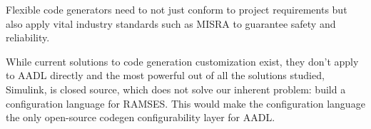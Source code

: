 \begin{tcolorbox}[colback=blue!5, colframe=blue!40!black] Flexible code generators need to not just conform to project requirements but also apply vital industry standards such as \gls{MISRA} to guarantee safety and reliability. \end{tcolorbox}


While current solutions to code generation customization exist, they don't apply to AADL directly and the most powerful out of all the solutions studied, Simulink, is closed source, which does not solve our inherent problem: build a configuration language for RAMSES. This would make the configuration language the only open-source codegen configurability layer for AADL.





